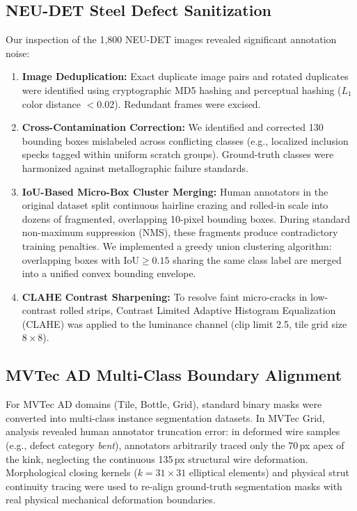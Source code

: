 \documentclass[conference]{IEEEtran}
\begin{document}
\subsection{NEU-DET Steel Defect Sanitization}
Our inspection of the 1,800 NEU-DET images revealed significant annotation noise:
\begin{enumerate}
    \item \textbf{Image Deduplication:} Exact duplicate image pairs and rotated duplicates were identified using cryptographic MD5 hashing and perceptual hashing ($L_1$ color distance $< 0.02$). Redundant frames were excised.
    \item \textbf{Cross-Contamination Correction:} We identified and corrected 130 bounding boxes mislabeled across conflicting classes (e.g., localized inclusion specks tagged within uniform scratch groups). Ground-truth classes were harmonized against metallographic failure standards.
    \item \textbf{IoU-Based Micro-Box Cluster Merging:} Human annotators in the original dataset split continuous hairline crazing and rolled-in scale into dozens of fragmented, overlapping 10-pixel bounding boxes. During standard non-maximum suppression (NMS), these fragments produce contradictory training penalties. We implemented a greedy union clustering algorithm: overlapping boxes with $\text{IoU} \ge 0.15$ sharing the same class label are merged into a unified convex bounding envelope.
    \item \textbf{CLAHE Contrast Sharpening:} To resolve faint micro-cracks in low-contrast rolled strips, Contrast Limited Adaptive Histogram Equalization (CLAHE) was applied to the luminance channel (clip limit 2.5, tile grid size $8\times 8$).
\end{enumerate}

\subsection{MVTec AD Multi-Class Boundary Alignment}
For MVTec AD domains (Tile, Bottle, Grid), standard binary masks were converted into multi-class instance segmentation datasets. In MVTec Grid, analysis revealed human annotator truncation error: in deformed wire samples (e.g., defect category \textit{bent}), annotators arbitrarily traced only the 70\,px apex of the kink, neglecting the continuous 135\,px structural wire deformation. Morphological closing kernels ($k=31\times 31$ elliptical elements) and physical strut continuity tracing were used to re-align ground-truth segmentation masks with real physical mechanical deformation boundaries.
\end{document}

